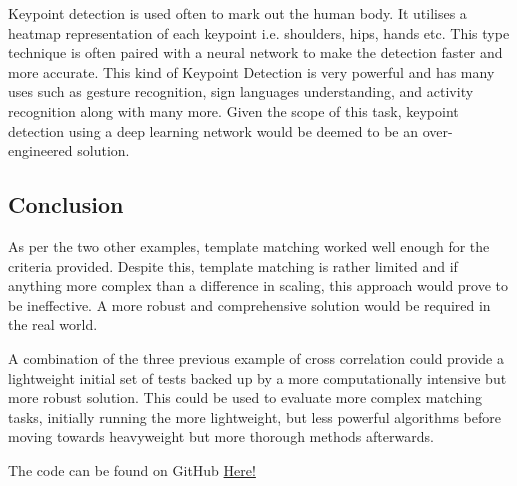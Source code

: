 \documentclass[conference]{IEEEtran}
\begin{document}
Keypoint detection is used often to mark out the human body. It utilises a heatmap representation of each keypoint i.e. shoulders, hips, hands etc. \cite{ref:keypoint_detection} This type technique is often paired with a neural network to make the detection faster and more accurate. This kind of Keypoint Detection is very powerful and has many uses such as gesture recognition, sign languages understanding, and activity recognition along with many more. \cite{ref:keypoint_detection_using_deep_learning} Given the scope of this task, keypoint detection using a deep learning network would be deemed to be an over-engineered solution.

\subsection{Conclusion}

As per the two other examples, template matching worked well enough for the criteria provided. Despite this, template matching is rather limited and if anything more complex than a difference in scaling, this approach would prove to be ineffective. A more robust and comprehensive solution would be required in the real world.

A combination of the three previous example of cross correlation could provide a lightweight initial set of tests backed up by a more computationally intensive but more robust solution. This could be used to evaluate more complex matching tasks, initially running the more lightweight, but less powerful algorithms before moving towards heavyweight but more thorough methods afterwards. 





The code can be found on GitHub \href{https://github.com/LukeDWaller99/Aint308}{Here!} 

\onecolumn
\end{document}
